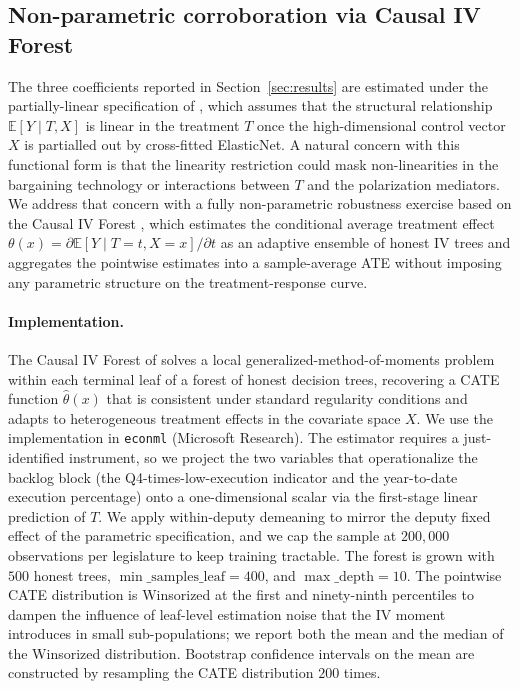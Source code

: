 \documentclass[preprint,12pt,authoryear]{elsarticle}
\begin{document}
\subsection{Non-parametric corroboration via Causal IV Forest}
\label{app:cforest}

The three coefficients reported in Section~\ref{sec:results} are estimated under the partially-linear specification of \citet{Chernozhukov2018}, which assumes that the structural relationship $\mathbb{E}[Y \mid T, X]$ is linear in the treatment $T$ once the high-dimensional control vector $X$ is partialled out by cross-fitted ElasticNet. A natural concern with this functional form is that the linearity restriction could mask non-linearities in the bargaining technology or interactions between $T$ and the polarization mediators. We address that concern with a fully non-parametric robustness exercise based on the Causal IV Forest \citep{AtheyTibshiraniWager2019}, which estimates the conditional average treatment effect $\theta(x) = \partial\mathbb{E}[Y \mid T = t, X = x] / \partial t$ as an adaptive ensemble of honest IV trees and aggregates the pointwise estimates into a sample-average ATE without imposing any parametric structure on the treatment-response curve.

\paragraph{Implementation.} The Causal IV Forest of \citet{AtheyTibshiraniWager2019} solves a local generalized-method-of-moments problem within each terminal leaf of a forest of honest decision trees, recovering a CATE function $\hat\theta(x)$ that is consistent under standard regularity conditions and adapts to heterogeneous treatment effects in the covariate space $X$. We use the implementation in \texttt{econml} (Microsoft Research). The estimator requires a just-identified instrument, so we project the two variables that operationalize the backlog block (the Q4-times-low-execution indicator and the year-to-date execution percentage) onto a one-dimensional scalar via the first-stage linear prediction of $T$. We apply within-deputy demeaning to mirror the deputy fixed effect of the parametric specification, and we cap the sample at $200{,}000$ observations per legislature to keep training tractable. The forest is grown with $500$ honest trees, $\min\_\mathrm{samples\_leaf} = 400$, and $\max\_\mathrm{depth} = 10$. The pointwise CATE distribution is Winsorized at the first and ninety-ninth percentiles to dampen the influence of leaf-level estimation noise that the IV moment introduces in small sub-populations; we report both the mean and the median of the Winsorized distribution. Bootstrap confidence intervals on the mean are constructed by resampling the CATE distribution $200$ times.
\end{document}
